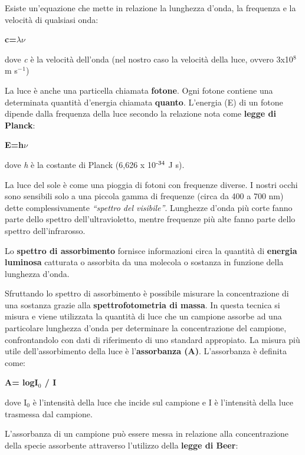 \documentclass[]{article}
\begin{document}
Esiste un'equazione che mette in relazione la lunghezza d'onda, la
frequenza e la velocità di qualsiasi onda:

\begin{center}\textbf{c=$\lambda$$\nu$}\end{center}

dove \emph{c} è la velocità dell'onda (nel nostro caso la velocità della
luce, ovvero 3x10$^8$ m s$^-$$^1$)

La luce è anche una particella chiamata \textbf{fotone}. Ogni fotone
contiene una determinata quantità d'energia chiamata \textbf{quanto}.
L'energia (E) di un fotone dipende dalla frequenza della luce secondo la
relazione nota come \textbf{legge di Planck}:

\begin{center}\textbf{E=h$\nu$}\end{center}

dove \emph{h} è la costante di Planck (6,626 x 10$\textsuperscript{-34}$
J s).

La luce del sole è come una pioggia di fotoni con frequenze diverse. I
nostri occhi sono sensibili solo a una piccola gamma di frequenze (circa
da 400 a 700 nm) dette complessivamente \emph{``spettro del visibile''}.
Lunghezze d'onda più corte fanno parte dello spettro dell'ultravioletto,
mentre frequenze più alte fanno parte dello spettro dell'infrarosso.

Lo \textbf{spettro di assorbimento} fornisce informazioni circa la
quantità di \textbf{energia luminosa} catturata o assorbita da una
molecola o sostanza in funzione della lunghezza d'onda.

Sfruttando lo spettro di assorbimento è possibile misurare la
concentrazione di una sostanza grazie alla \textbf{spettrofotometria di
massa}. In questa tecnica si misura e viene utilizzata la quantità di
luce che un campione assorbe ad una particolare lunghezza d'onda per
determinare la concentrazione del campione, confrontandolo con dati di
riferimento di uno standard appropiato. 
La misura più utile dell'assorbimento della luce è l'\textbf{assorbanza (A)}. L'assorbanza è definita come:

\begin{center}\textbf{A= logI$_0$ / I} \end{center}

dove I$_0$ è l'intensità della luce che incide sul campione e I è l'intensità della luce trasmessa dal campione. 

L'assorbanza di un campione può essere messa in relazione alla
concentrazione della specie assorbente attraverso l'utilizzo della
\textbf{legge di Beer}:
\end{document}
